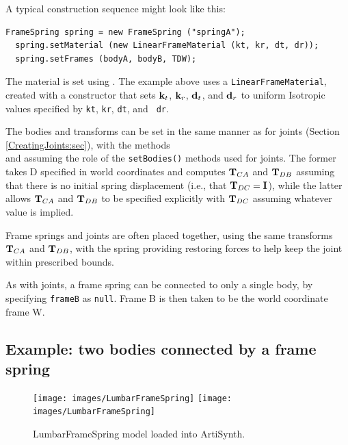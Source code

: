 A typical construction sequence might look like this:
%
\begin{lstlisting}[]
  FrameSpring spring = new FrameSpring ("springA");
  spring.setMaterial (new LinearFrameMaterial (kt, kr, dt, dr));
  spring.setFrames (bodyA, bodyB, TDW);
\end{lstlisting}
%
The material is set using
.
The example above uses a {\tt LinearFrameMaterial}, created with a
constructor that sets ${\bf k}_t$, ${\bf k}_r$, ${\bf d}_t$, and ${\bf d}_r$ to uniform
Isotropic values specified by {\tt kt}, {\tt kr}, {\tt dt}, and {\tt
dr}. 

The bodies and transforms can be set in the same manner as for joints
(Section \ref{CreatingJoints:sec}), with the
methods\\ 
and
assuming the role of the {\tt setBodies()} methods used for joints.
The former takes D specified in world coordinates and computes
${\bf T}_{CA}$ and ${\bf T}_{DB}$ assuming that there is no initial spring
displacement (i.e., that ${\bf T}_{DC} = {\bf I}$), while the latter allows
${\bf T}_{CA}$ and ${\bf T}_{DB}$ to be specified explicitly with ${\bf T}_{DC}$
assuming whatever value is implied.

Frame springs and joints are often placed together, using the same
transforms ${\bf T}_{CA}$ and ${\bf T}_{DB}$, with the spring providing
restoring forces to help keep the joint within prescribed bounds.

As with joints, a frame spring can be connected to only a single body,
by specifying {\tt frameB} as {\tt null}. Frame B is then taken to be
the world coordinate frame W.

\subsection{Example: two bodies connected by a frame spring}
\label{LumbarFrameSpring:sec}

\begin{figure}[ht]
\begin{center}
\iflatexml
 \texttt{[image: images/LumbarFrameSpring]}
\else
 \texttt{[image: images/LumbarFrameSpring]}
\fi
\end{center}
\caption{LumbarFrameSpring model loaded into ArtiSynth.}
\label{LumbarFrameSpring:fig}
\end{figure}

